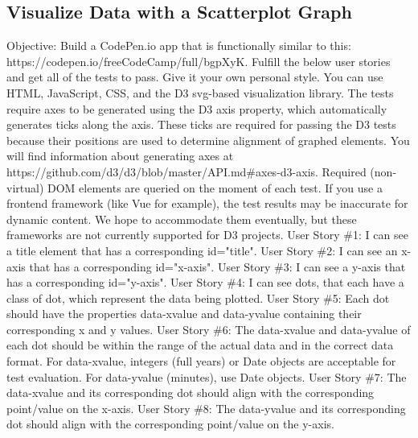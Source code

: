 \documentclass{article}%
\begin{document}
\subsection{Visualize Data with a Scatterplot Graph}%
\label{subsec:VisualizeDatawithaScatterplotGraph}%
Objective: Build a CodePen.io app that is functionally similar to this: https://codepen.io/freeCodeCamp/full/bgpXyK.\newline%
Fulfill the below user stories and get all of the tests to pass. Give it your own personal style.\newline%
You can use HTML, JavaScript, CSS, and the D3 svg{-}based visualization library. The tests require axes to be generated using the D3 axis property, which automatically generates ticks along the axis. These ticks are required for passing the D3 tests because their positions are used to determine alignment of graphed elements. You will find information about generating axes at https://github.com/d3/d3/blob/master/API.md\#axes{-}d3{-}axis. Required (non{-}virtual) DOM elements are queried on the moment of each test. If you use a frontend framework (like Vue for example), the test results may be inaccurate for dynamic content. We hope to accommodate them eventually, but these frameworks are not currently supported for D3 projects.\newline%
User Story \#1: I can see a title element that has a corresponding id="title".\newline%
User Story \#2: I can see an x{-}axis that has a corresponding id="x{-}axis".\newline%
User Story \#3: I can see a y{-}axis that has a corresponding id="y{-}axis".\newline%
User Story \#4: I can see dots, that each have a class of dot, which represent the data being plotted.\newline%
User Story \#5: Each dot should have the properties data{-}xvalue and data{-}yvalue containing their corresponding x and y values.\newline%
User Story \#6: The data{-}xvalue and data{-}yvalue of each dot should be within the range of the actual data and in the correct data format. For data{-}xvalue, integers (full years) or Date objects are acceptable for test evaluation. For data{-}yvalue (minutes), use Date objects.\newline%
User Story \#7: The data{-}xvalue and its corresponding dot should align with the corresponding point/value on the x{-}axis.\newline%
User Story \#8: The data{-}yvalue and its corresponding dot should align with the corresponding point/value on the y{-}axis.\newline%
\end{document}
